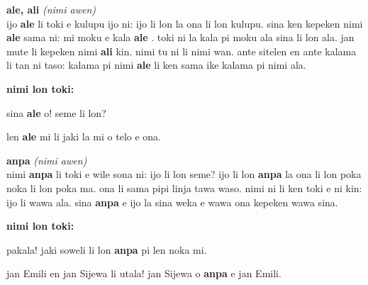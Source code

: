 \documentclass[a4paper,11pt]{book}
\newenvironment{definition}[2]{ %
  \begin{description}
  \item
    {\huge \textbf{#1}}
    {\Large \textit{(#2)}} \\
}{
  \end{description}%
}
\newenvironment{example}{ %
  \item
  \textbf{nimi lon toki:}
  
  \hfill
  \begin{minipage}{\dimexpr\textwidth-1cm}
  \begin{itshape}
}
{
  \end{itshape}
  \end{minipage}
}
\newcommand{\inex}[1]{%
  \textbf{#1}%
}
\begin{document}
\begin{definition}{ale, ali}{nimi awen}
  ijo \inex{ale} li toki e kulupu ijo ni: ijo li lon la ona li lon kulupu. sina ken kepeken nimi \inex{ale} sama ni: mi moku e kala \inex{ale}. toki ni la kala pi moku ala sina li lon ala. jan mute li kepeken nimi \inex{ali} kin. nimi tu ni li nimi wan. ante sitelen en ante kalama li tan ni taso: kalama pi nimi \inex{ale} li ken sama ike kalama pi nimi ala.
  \begin{example}
    sina \inex{ale} o! seme li lon?
    
    len \inex{ale} mi li jaki la mi o telo e ona.
  \end{example}
\end{definition}

\begin{definition}{anpa}{nimi awen}
  nimi \inex{anpa} li toki e wile sona ni: ijo li lon seme? ijo li lon \inex{anpa} la ona li lon poka noka li lon poka ma. ona li sama pipi linja tawa waso. nimi ni li ken toki e ni kin: ijo li wawa ala. sina \inex{anpa} e ijo la sina weka e wawa ona kepeken wawa sina.
  \begin{example}
    pakala! jaki soweli li lon \inex{anpa} pi len noka mi.
    
    jan Emili en jan Sijewa li utala! jan Sijewa o \inex{anpa} e jan Emili.
  \end{example}
\end{definition}
\end{document}
